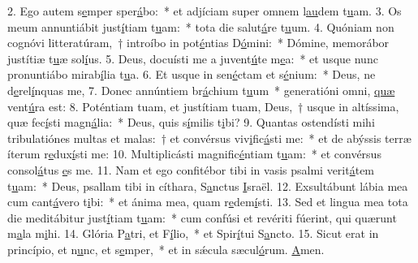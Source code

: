 2. Ego autem s\uline{e}mper sper\uline{á}bo:~* et adjíciam super omnem l\uline{au}dem t\uline{u}am.
3. Os meum annuntiábit just\uline{í}tiam t\uline{u}am:~* tota die salut\uline{á}re t\uline{u}um.
4. Quóniam non cognóvi litteratúram,~† introíbo in pot\uline{é}ntias D\uline{ó}mini:~* Dómine, memorábor justítiæ t\uline{u}æ sol\uline{í}us.
5. Deus, docuísti me a juvent\uline{ú}te m\uline{e}a:~* et usque nunc pronuntiábo mirab\uline{í}lia t\uline{u}a.
6. Et usque in sen\uline{é}ctam et s\uline{é}nium:~* Deus, ne d\uline{e}rel\uline{í}nquas me,
7. Donec annúntiem br\uline{á}chium t\uline{u}um~* generatióni omni, \uline{quæ} vent\uline{ú}ra est:
8. Poténtiam tuam, et justítiam tuam, Deus,~† usque in altíssima, quæ fec\uline{í}sti magn\uline{á}lia:~* Deus, quis s\uline{í}milis t\uline{i}bi?
9. Quantas ostendísti mihi tribulatiónes multas et malas:~† et convérsus viv\uline{i}fic\uline{á}sti me:~* et de abýssis terræ íterum r\uline{e}dux\uline{í}sti me:
10. Multiplicásti magnific\uline{é}ntiam t\uline{u}am:~* et convérsus consol\uline{á}tus \uline{e}s me.
11. Nam et ego confitébor tibi in vasis psalmi verit\uline{á}tem t\uline{u}am:~* Deus, psallam tibi in cíthara, S\uline{a}nctus \uline{I}sraël.
12. Exsultábunt lábia mea cum cant\uline{á}vero t\uline{i}bi:~* et ánima mea, quam r\uline{e}dem\uline{í}sti.
13. Sed et lingua mea tota die meditábitur just\uline{í}tiam t\uline{u}am:~* cum confúsi et revériti fúerint, qui quærunt m\uline{a}la m\uline{i}hi.
14. Glória P\uline{a}tri, et F\uline{í}lio,~* et Spir\uline{í}tui S\uline{a}ncto.
15. Sicut erat in princípio, et n\uline{u}nc, et s\uline{e}mper,~* et in sǽcula sæcul\uline{ó}rum. \uline{A}men.
